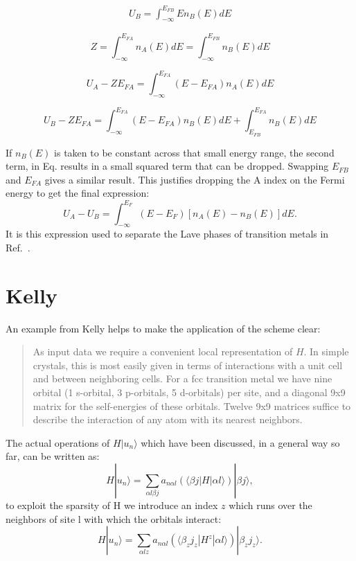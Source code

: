 \documentclass{article}
\def\ket{\rangle}
\def\bra{\langle}
\begin{document}
\begin{eqnarray}
\label{eq:Ub}
U_{B} = \int_{-\infty}^{E_{FB}} E n_{B}(E) dE
\end{eqnarray}

\begin{equation}
\label{eq:totaldos}
Z = \int_{-\infty}^{E_{FA}} n_{A}(E)dE = \int_{-\infty}^{E_{FB}}n_{B}(E)dE
\end{equation}

\begin{equation}
U_{A}-ZE_{FA}= \int_{-\infty}^{E_{FA}}(E-E_{FA})n_{A}(E)dE
\end{equation}

\begin{equation}
U_{B}-ZE_{FA}= \int_{-\infty}^{E_{FA}}(E-E_{FA})n_{B}(E)dE + \int_{E_{FB}}^{E_{FA}}n_{B}(E)dE
\end{equation}

If $n_{B}(E)$ is taken to be constant across that small energy range, the second term, in
Eq. results in a small squared term that can be dropped. Swapping $E_{FB}$ and $E_{FA}$ gives
a similar result. This justifies dropping the A index on the Fermi energy to get the
final expression:
%
\begin{equation}
U_{A}-U_{B} = \int_{-\infty}^{E_{F}}(E-E_{F})[n_{A}(E) -n_{B}(E)]dE.
\end{equation}
%
It is this expression used to separate the Lave phases of transition metals in Ref.~\cite{haydock76}.

\section{Kelly}
An example from Kelly helps to make the application of the scheme clear:
%
\begin{quote}
As input data we require a convenient local representation of $H$. In simple crystals,
this is most easily given in terms of interactions with a unit cell and between neighboring cells.
For a fcc transition metal we have nine orbital (1 s-orbital, 3 p-orbitals, 5 d-orbitals) per site, and a diagonal 9x9 matrix
for the self-energies of these orbitals. Twelve 9x9 matrices suffice to describe the interaction 
of any atom with its nearest neighbors.
\end{quote}
%

The actual operations of $H|u_{n}\ket$ which have been discussed, in a general way so far, 
can be written as:
%
\begin{equation}
H|u_{n}\ket = \sum_{\alpha l \beta j}a_{n \alpha l}(\bra \beta j |H| \alpha l\ket)|\beta j\ket,
\end{equation}
%
to exploit the sparsity of H we introduce an index $z$ which runs over the neighbors of 
site l with which the orbitals interact:
\begin{equation}
H|u_{n}\ket = \sum_{\alpha l z}a_{n \alpha l}(\bra \beta_{z} j_{z} |H^{z}|\alpha l\ket)|\beta_{z} j_{z}\ket.
\end{equation}
\end{document}
